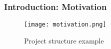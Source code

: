\begin{frame}

\frametitle{Introduction: Motivation}

\pause

\begin{figure}[h]
\centering
\texttt{[image: motivation.png]}
\caption{Project structure example}
\label{fig:motivation}
\end{figure}

\end{frame}
